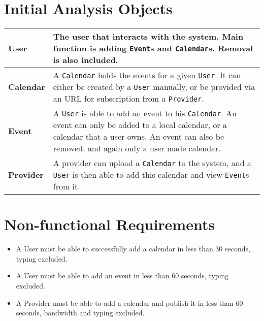 \documentclass[10pt]{report}
\numberwithin{equation}{section} %
\numberwithin{figure}{section} %
\numberwithin{table}{section} %
\begin{document}
\section{Initial Analysis Objects}
\begin{table}[H]
\begin{tabularx}{\textwidth}{l X}
\midrule
\textbf{User} & The user that interacts with the system. Main function is adding
  \texttt{Event}s and \texttt{Calendar}s. Removal is also included.\\ \midrule
\textbf{Calendar} & A \texttt{Calendar} holds the events for a given
  \texttt{User}. It can either be created by a \texttt{User} manually, or be
  provided via an URL for subscription from a \texttt{Provider}. \\ \midrule
\textbf{Event} & A \texttt{User} is able to add an event to his
  \texttt{Calendar}. An event can only be added to a local calendar, or a calendar
  that a user owns. An event can also be removed, and again only a user made
  calendar.\\ \midrule
\textbf{Provider} & A provider can upload a \texttt{Calendar} to the system, and
  a \texttt{User} is then able to add this calendar and view \texttt{Event}s
  from it.\\ \midrule
\end{tabularx}
\end{table}

\section{Non-functional Requirements}
\begin{itemize}
\item A User must be able to successfully add a calendar in less than 30
  seconds, typing excluded.
\item A User must be able to add an event in less than 60 seconds, typing
  excluded.
\item A Provider must be able to add a calendar and publish it in less than 60
  seconds, bandwidth and typing excluded.
\end{itemize}
\end{document}
